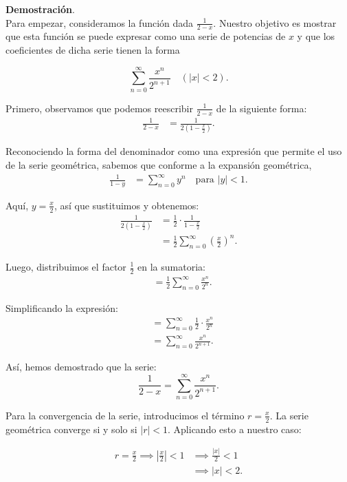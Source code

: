 \documentclass{article}
\begin{document}
    \textbf{Demostración}.\\

    Para empezar, consideramos la función dada $\frac{1}{2-x}$. Nuestro objetivo es mostrar que esta función se puede expresar como una serie de potencias de $x$ y que los coeficientes de dicha serie tienen la forma

    $$\sum_{n=0}^{\infty} \frac{x^{n}}{2^{n+1}} \quad(|x|<2).$$

    Primero, observamos que podemos reescribir $\frac{1}{2-x}$ de la siguiente forma:
    \begin{align*}
    \frac{1}{2-x} &= \frac{1}{2\left(1-\frac{x}{2}\right)}.
    \end{align*}

    Reconociendo la forma del denominador como una expresión que permite el uso de la serie geométrica, sabemos que conforme a la expansión geométrica,
    \begin{align*}
    \frac{1}{1-y} &= \sum_{n=0}^{\infty} y^n \quad \text{para } |y| < 1.
    \end{align*}

    Aquí, $y = \frac{x}{2}$, así que sustituimos y obtenemos:
    \begin{align*}
    \frac{1}{2\left(1-\frac{x}{2}\right)} &= \frac{1}{2} \cdot \frac{1}{1-\frac{x}{2}} \\
    &= \frac{1}{2} \sum_{n=0}^{\infty} \left(\frac{x}{2}\right)^n.
    \end{align*}

    Luego, distribuimos el factor $\frac{1}{2}$ en la sumatoria:
    \begin{align*}
    &= \frac{1}{2} \sum_{n=0}^{\infty} \frac{x^n}{2^n}.
    \end{align*}

    Simplificando la expresión:
    \begin{align*}
    &= \sum_{n=0}^{\infty} \frac{1}{2} \cdot \frac{x^n}{2^n} \\
    &= \sum_{n=0}^{\infty} \frac{x^n}{2^{n+1}}.
    \end{align*}

    Así, hemos demostrado que la serie:
    $$\frac{1}{2-x} = \sum_{n=0}^{\infty} \frac{x^n}{2^{n+1}}.$$

    Para la convergencia de la serie, introducimos el término $r = \frac{x}{2}$. La serie geométrica converge si y solo si $|r| < 1$. Aplicando esto a nuestro caso:

    \begin{align*}
    r = \frac{x}{2} \implies \left|\frac{x}{2}\right| < 1 & \implies \frac{|x|}{2} < 1 \\
    & \implies |x| < 2.
    \end{align*}
\end{document}
